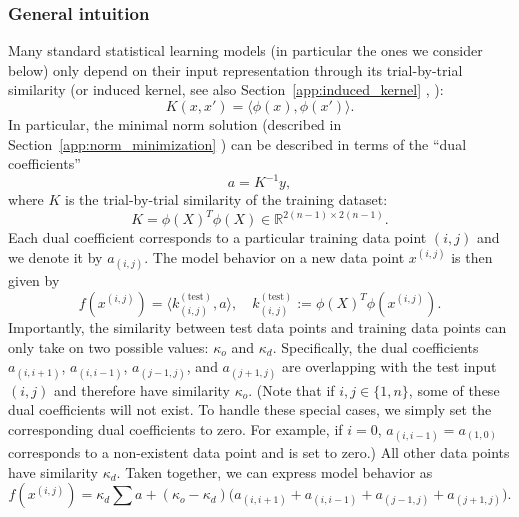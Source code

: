 \documentclass{article}
\theoremstyle{plain}
\begin{document}
\subsubsection{General intuition}
\label{app:ti_intuition}
Many standard statistical learning models (in particular the ones we consider below) only depend on their input representation through its trial-by-trial similarity (or induced kernel, see also Section~\ref{app:induced_kernel} %
, \cite{TODO_ref7}):
\begin{equation}
    K(x,x')=\langle\phi(x),\phi(x')\rangle.
\end{equation}
In particular, the minimal norm solution (described in Section~\ref{app:norm_minimization} %
) can be described in terms of the ``dual coefficients''
\begin{equation}
    a=K^{-1}y,
    \label{eq:dual}
\end{equation}
where $K$ is the trial-by-trial similarity of the training dataset:
\begin{equation}
    K=\phi(X)^T\phi(X)\in\mathbb{R}^{2(n-1)\times 2(n-1)}.
\end{equation}
Each dual coefficient corresponds to a particular training data point $(i,j)$ and we denote it by $a_{(i,j)}$. The model behavior on a new data point $x^{(i,j)}$ is then given by
\begin{equation}
    f(x^{(i,j)})=\langle k_{(i,j)}^{(\text{test})},a\rangle,\quad k_{(i,j)}^{(\text{test})}:=\phi(X)^T\phi(x^{(i,j)}).
\end{equation}
Importantly, the similarity between test data points and training data points can only take on two possible values: $\kappa_o$ and $\kappa_d$. Specifically, the dual coefficients $a_{(i,i+1)}$, $a_{(i,i-1)}$, $a_{(j-1,j)}$, and $a_{(j+1,j)}$ are overlapping with the test input $(i,j)$ and therefore have similarity $\kappa_o$. (Note that if $i,j\in\{1,n\}$, some of these dual coefficients will not exist. To handle these special cases, we simply set the corresponding dual coefficients to zero. For example, if $i=0$, $a_{(i,i-1)}=a_{(1,0)}$ corresponds to a non-existent data point and is set to zero.) All other data points have similarity $\kappa_d$. Taken together, we can express model behavior as
\begin{equation}
    f(x^{(i,j)})=\kappa_d\sum a+(\kappa_o-\kappa_d)\bigl(a_{(i,i+1)}+a_{(i,i-1)}+a_{(j-1,j)}+a_{(j+1,j)}\bigr).
\end{equation}
\end{document}
